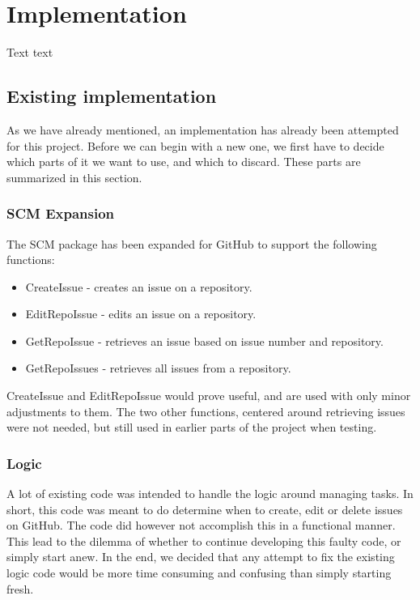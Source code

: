 
\chapter{Implementation}
\label{ch:implementation}

Text text

\section{Existing implementation}

As we have already mentioned, an implementation has already been attempted for this project.
Before we can begin with a new one, we first have to decide which parts of it we want to use, and which to discard.
These parts are summarized in this section.

\subsection{SCM Expansion}
\label{sec:scm_expansion}

The SCM package has been expanded for GitHub to support the following functions:

\begin{itemize}
    \item CreateIssue   - creates an issue on a repository.
    \item EditRepoIssue - edits an issue on a repository.
    \item GetRepoIssue  - retrieves an issue based on issue number and repository.
    \item GetRepoIssues - retrieves all issues from a repository.
\end{itemize}

CreateIssue and EditRepoIssue would prove useful, and are used with only minor adjustments to them.
The two other functions, centered around retrieving issues were not needed, but still used in earlier parts of the project when testing.

\subsection{Logic}

A lot of existing code was intended to handle the logic around managing tasks. 
In short, this code was meant to do determine when to create, edit or delete issues on GitHub.
The code did however not accomplish this in a functional manner.
This lead to the dilemma of whether to continue developing this faulty code, or simply start anew.
In the end, we decided that any attempt to fix the existing logic code would be more time consuming and confusing than simply starting fresh.

